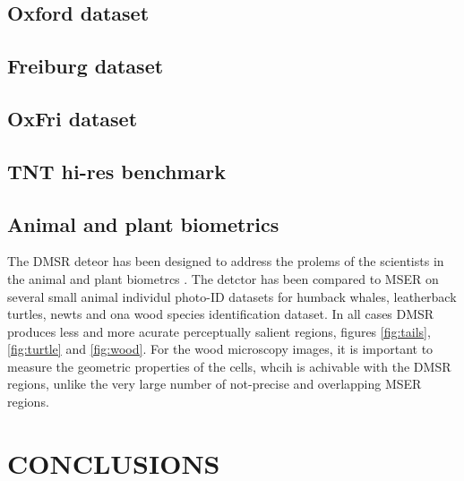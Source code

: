 \documentclass{article}
\begin{document}
\subsection{Oxford dataset}
\label{ssec:oxford}

\subsection{Freiburg dataset}
\label{ssec:freiburg}
\subsection{OxFri dataset}
\label{ssec:combined}
\subsection{TNT hi-res benchmark}
\label{ssec:tnt}
\subsection{Animal and plant biometrics}
\label{ssec:bio}
The DMSR deteor has been designed to address the prolems of the scientists in the animal and plant biometrcs \cite{Kuehl2013}. The detctor has been compared to MSER on several small animal individul photo-ID datasets for humback whales, leatherback turtles, newts and ona wood species identification dataset. In all cases DMSR produces less and more acurate perceptually salient regions, figures \ref{fig:tails}, \ref{fig:turtle} and \ref{fig:wood}. For the wood microscopy images, it is important to measure the geometric properties of the cells, whcih is achivable with the DMSR regions, unlike the very large number of not-precise and overlapping MSER regions.

\section{CONCLUSIONS}
\label{sec:concl}










\end{document}
